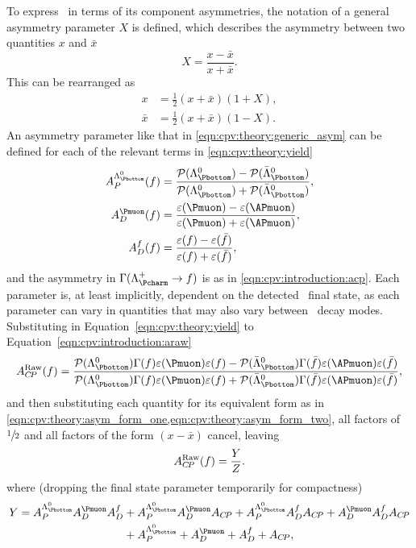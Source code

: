 To express \ARaw\ in terms of its component asymmetries, the notation of a 
general asymmetry parameter $X$ is defined, which describes the asymmetry 
between two quantities $x$ and $\bar{x}$
\begin{equation}
  X = \frac{x - \bar{x}}{x + \bar{x}}.
  \label{eqn:cpv:theory:generic_asym}
\end{equation}
This can be rearranged as
\begin{align}
  x &= \frac{1}{2}(x + \bar{x})(1 + X),\label{eqn:cpv:theory:asym_form_one}\\
  \bar{x} &= \frac{1}{2}(x + \bar{x})(1 - X).\label{eqn:cpv:theory:asym_form_two}
\end{align}
An asymmetry parameter like that in \cref{eqn:cpv:theory:generic_asym} can be defined for each of the relevant terms in 
\cref{eqn:cpv:theory:yield}
\begin{align*}
  \APLb(f) &= \frac{%
    \prob(\PLambdab) - \prob(\APLambdab)
  }{%
    \prob(\PLambdab) + \prob(\APLambdab)
  },\\
  \ADmu(f) &= \frac{%
    \eff(\Pmuon) - \eff(\APmuon)
  }{%
    \eff(\Pmuon) + \eff(\APmuon)
  },\\
  \ADf(f)  &= \frac{%
    \eff(f) - \eff(\bar{f})
  }{%
    \eff(f) + \eff(\bar{f})
  },
\end{align*}
and the asymmetry in $\Gamma(\LcTof)$ is \ACP as in 
\cref{eqn:cpv:introduction:acp}.
Each parameter is, at least implicitly, dependent on the detected \PLambdac\ 
final state, as each parameter can vary in quantities that may also vary 
between \PLambdac\ decay modes.
Substituting in Equation~\ref{eqn:cpv:theory:yield} to 
Equation~\ref{eqn:cpv:introduction:araw}
\begin{equation*}
  \ARaw(f) = \frac{%
    \prob(\PLambdab)\Gamma(f)\eff(\Pmuon)\eff(f) - 
    \prob(\APLambdab)\Gamma(\bar{f})\eff(\APmuon)\eff(\bar{f})
  }{%
    \prob(\PLambdab)\Gamma(f)\eff(\Pmuon)\eff(f) + 
    \prob(\APLambdab)\Gamma(\bar{f})\eff(\APmuon)\eff(\bar{f})
  },
\end{equation*}
and then substituting each quantity for its equivalent form as in 
\cref{eqn:cpv:theory:asym_form_one,eqn:cpv:theory:asym_form_two}, all factors 
of $\sfrac{1}{2}$ and all factors of the form $(x - \bar{x})$ cancel, leaving
\begin{equation}
  A_{C\!P}^{\textnormal{Raw}}(f) = \frac{Y}{Z}.
\end{equation}
where (dropping the final state parameter temporarily for compactness)
\begin{align}
  Y = \APLb\ADmu\ADf &+ \APLb\ADmu\ACP + \APLb\ADf\ACP + \ADmu\ADf\ACP \nonumber\\
                     &+ \APLb +  \ADmu + \ADf + \ACP,
\end{align}
